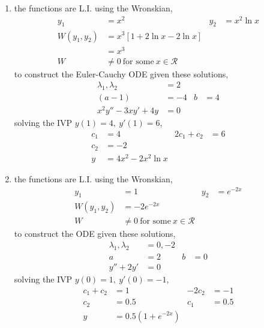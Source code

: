 \begin{enumerate}
    \item the functions are L.I. using the Wronskian,
          \begin{align}
              y_{1}           & = x^{2}                                    &
              y_{2}           & = x^{2}\ln x                                 \\
              W(y_{1}, y_{2}) & = x^{3}[1 + 2\ln x - 2\ln x]                 \\
                              & = x^{3}                                      \\
              W               & \neq 0\ \text{for some}\ x \in \mathcal{R}
          \end{align}
          to construct the Euler-Cauchy ODE given these solutions,
          \begin{align}
              \lambda_{1}, \lambda_{2} & = 2            \\
              (a-1)                    & = -4 & b & = 4 \\
              x^{2}y'' - 3xy' + 4y     & = 0
          \end{align}
          solving the IVP $ y(1) = 4,\ y'(1) = 6 $,
          \begin{align}
              c_{1} & = 4                      & 2c_{1} + c_{2} & = 6 \\
              c_{2} & = -2                                            \\
              y     & = 4x^{2}  - 2 x^{2}\ln x
          \end{align}

    \item the functions are L.I. using the Wronskian,
          \begin{align}
              y_{1}           & = 1                                        &
              y_{2}           & = e^{-2x}                                    \\
              W(y_{1}, y_{2}) & = -2e^{-2x}                                  \\
              W               & \neq 0\ \text{for some}\ x \in \mathcal{R}
          \end{align}
          to construct the ODE given these solutions,
          \begin{align}
              \lambda_{1}, \lambda_{2} & = 0, -2           \\
              a                        & = 2     & b & = 0 \\
              y'' + 2y'                & = 0
          \end{align}
          solving the IVP $ y(0) = 1,\ y'(0) = -1 $,
          \begin{align}
              c_{1} + c_{2} & = 1                 & -2c_{2} & = -1  \\
              c_{2}         & = 0.5               & c_{1}   & = 0.5 \\
              y             & = 0.5 (1 + e^{-2x})
          \end{align}


\end{enumerate}
